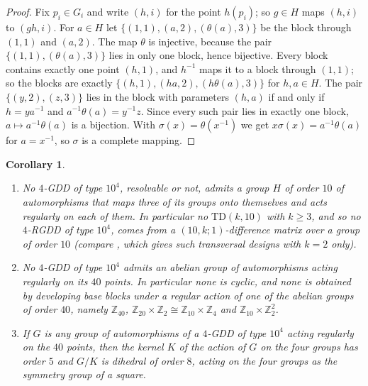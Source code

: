 \documentclass[11pt]{article}
\newtheorem{corollary}[theorem]{Corollary}
\theoremstyle{remark}
\newcommand{\Z}{\mathbb{Z}}
\newcommand{\TD}{\mathrm{TD}}
\begin{document}
\begin{proof}
Fix $p_i\in G_i$ and write $(h,i)$ for the point $h(p_i)$; so $g\in H$ maps $(h,i)$ to
$(gh,i)$.  For $a\in H$ let $\{(1,1),(a,2),(\theta(a),3)\}$ be the block through $(1,1)$ and
$(a,2)$.  The map $\theta$ is injective, because the pair $\{(1,1),(\theta(a),3)\}$ lies in
only one block, hence bijective.  Every block contains exactly one point $(h,1)$, and
$h^{-1}$ maps it to a block through $(1,1)$; so the blocks are exactly
$\{(h,1),(ha,2),(h\theta(a),3)\}$ for $h,a\in H$.  The pair $\{(y,2),(z,3)\}$ lies in the
block with parameters $(h,a)$ if and only if $h=ya^{-1}$ and $a^{-1}\theta(a)=y^{-1}z$.
Since every such pair lies in exactly one block, $a\mapsto a^{-1}\theta(a)$ is a
bijection.  With $\sigma(x)=\theta(x^{-1})$ we get $x\sigma(x)=a^{-1}\theta(a)$ for
$a=x^{-1}$, so $\sigma$ is a complete mapping.
\end{proof}

\begin{corollary}\label{cor:aut}
\begin{enumerate}
\item[(a)] No $4$-GDD of type $10^{4}$, resolvable or not, admits a group $H$ of order $10$
  of automorphisms that maps three of its groups onto themselves and acts regularly on
  each of them.  In particular no $\TD(k,10)$ with $k\ge 3$, and so no $4$-RGDD of type
  $10^{4}$, comes from a $(10,k;1)$-difference matrix over a group of order $10$
  (compare \cite[Lemma~2.8]{WG14}, which gives such transversal designs with $k=2$ only).
\item[(b)] No $4$-GDD of type $10^{4}$ admits an abelian group of automorphisms acting
  regularly on its $40$ points.  In particular none is cyclic, and none is obtained by
  developing base blocks under a regular action of one of the abelian groups of order
  $40$, namely $\Z_{40}$, $\Z_{20}\times\Z_2\cong\Z_{10}\times\Z_4$ and
  $\Z_{10}\times\Z_2^{2}$.
\item[(c)] If $G$ is any group of automorphisms of a $4$-GDD of type $10^{4}$ acting
  regularly on the $40$ points, then the kernel $K$ of the action of $G$ on the four
  groups has order $5$ and $G/K$ is dihedral of order $8$, acting on the four groups as
  the symmetry group of a square.
\end{enumerate}
\end{corollary}
\end{document}

